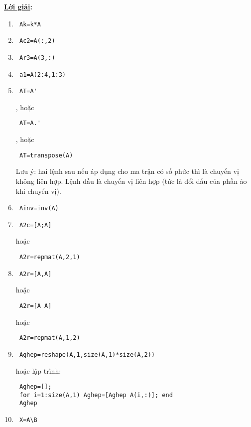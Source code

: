 \documentclass[12pt]{article}
\newcommand{\Solution}{
\medskip
{\bf \underline{Lời giải}:}
}
\begin{document}
\Solution
\begin{enumerate}
 \item \begin{verbatim} Ak=k*A \end{verbatim}
 \item \begin{verbatim} Ac2=A(:,2) \end{verbatim}
 \item \begin{verbatim} Ar3=A(3,:) \end{verbatim}
 \item \begin{verbatim} a1=A(2:4,1:3) \end{verbatim}
 \item \begin{verbatim} AT=A' \end{verbatim},
 hoặc \begin{verbatim} AT=A.' \end{verbatim},
 hoặc \begin{verbatim} AT=transpose(A) \end{verbatim}
 Lưu ý: hai lệnh sau nếu áp dụng cho ma trận có số phức thì là chuyển vị không liên hợp. Lệnh đầu là chuyển vị liên hợp (tức là đổi dấu của phần ảo khi chuyển vị).
 \item \begin{verbatim} Ainv=inv(A) \end{verbatim}
 \item \begin{verbatim} A2c=[A;A] \end{verbatim}
 hoặc \begin{verbatim} A2r=repmat(A,2,1) \end{verbatim}
 \item \begin{verbatim} A2r=[A,A] \end{verbatim}
 hoặc \begin{verbatim} A2r=[A A] \end{verbatim}
 hoặc \begin{verbatim} A2r=repmat(A,1,2) \end{verbatim}
 \item \begin{verbatim} Aghep=reshape(A,1,size(A,1)*size(A,2)) \end{verbatim}
 hoặc lập trình: 
 \begin{verbatim} Aghep=[];
 for i=1:size(A,1) Aghep=[Aghep A(i,:)]; end
 Aghep 
 \end{verbatim}
 \item \begin{verbatim} X=A\B \end{verbatim}
\end{enumerate}
\end{document}
